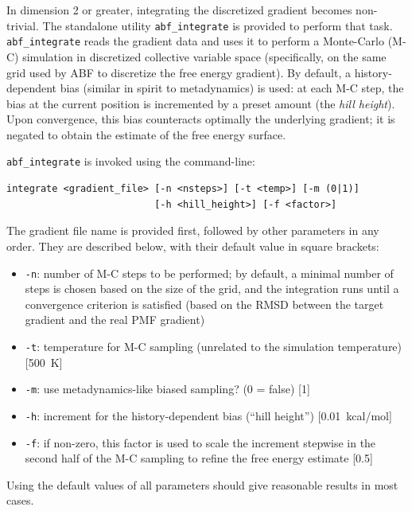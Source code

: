In dimension 2 or greater, integrating the discretized gradient becomes non-trivial. The
standalone utility \texttt{abf\_integrate} is provided to perform that task.
\texttt{abf\_integrate} reads the gradient data and uses it to perform a Monte-Carlo (M-C)
simulation in discretized collective variable space (specifically, on the same grid
used by ABF to discretize the free energy gradient).
By default, a history-dependent bias (similar in spirit to metadynamics) is used:
at each M-C step, the bias at the current position is incremented by a preset amount
(the \emph{hill height}).
Upon convergence, this bias counteracts optimally the underlying gradient;
it is negated to obtain the estimate of the free energy surface.

\texttt{abf\_integrate} is invoked using the command-line:
{\small
\begin{verbatim}
integrate <gradient_file> [-n <nsteps>] [-t <temp>] [-m (0|1)]
                          [-h <hill_height>] [-f <factor>]
\end{verbatim}
}

The gradient file name is provided first, followed by other parameters in any order.
They are described below, with their default value in square brackets:
\begin{itemize}
\setlength{\itemsep}{0pt}
\item \texttt{-n}: number of M-C steps to be performed; by default, a minimal number of
steps is chosen based on the size of the grid, and the integration runs until a convergence
criterion is satisfied (based on the RMSD between the target gradient and the real PMF gradient)
\item \texttt{-t}: temperature for M-C sampling (unrelated to the simulation temperature)
  [500~K]
\item \texttt{-m}: use metadynamics-like biased sampling? (0 = false) [1]
\item \texttt{-h}: increment for the history-dependent bias (``hill height'') [0.01~kcal/mol]
\item \texttt{-f}: if non-zero, this factor is used to scale the increment stepwise in the 
  second half of the M-C sampling to refine the free energy estimate [0.5]
\end{itemize}

Using the default values of all parameters should give reasonable results in most cases.

